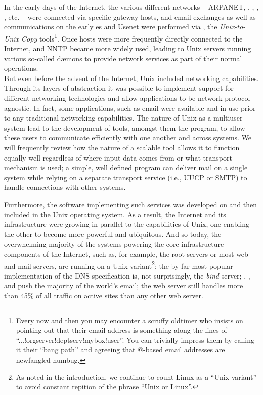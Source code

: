 In the early days of the Internet, the various
different networks -- ARPANET,
,
,
,
, etc. -- were connected
via specific gateway hosts, and email exchanges as
well as communications on the early
es and
Usenet were performed via
, the {\em Unix-to-Unix Copy}
tools\footnote{Every now and then you may encounter
a scruffy oldtimer who insists on pointing out that
their email address is something along the lines of
``...!orgserver!deptserv!mybox!user''. You can
trivially impress them by calling it their ``bang
path'' and agreeing that @-based email addresses are
newfangled humbug.}.  Once hosts were more frequently
directly connected to the Internet,
 and NNTP
became more widely used, leading to Unix servers
running various so-called  d\ae mons
to provide network services as part of their normal
operations.  \\

But even before the advent of the Internet, Unix
included networking capabilities.  Through its layers
of abstraction it was possible to implement support
for different networking technologies and allow
applications to be network protocol agnostic.  In
fact, some applications, such as  email
were available and in use prior to any traditional
networking capabilities.  The nature of Unix as a
multiuser system lead to the development of tools,
amongst them the  program, to allow
these users to communicate efficiently with one
another and across systems.  We will frequently review
how the nature of a scalable tool allows it to
function equally well regardless of where input data
comes from or what transport mechanism is used; a
simple, well defined program can deliver mail on a
single system while relying on a separate transport
service (i.e., UUCP or SMTP) to handle connections
with other systems.

Furthermore, the software implementing such services
was developed on and then included in the Unix
operating system.  As a result, the Internet and its
infrastructure were growing in parallel to the
capabilities of Unix, one enabling the other to become
more powerful and ubiquitous. And so today, the
overwhelming majority of the systems powering the core
infrastructure components of the Internet, such as,
for example, the  root
servers or most
web- and mail servers, are running on a Unix
variant\footnote{As noted in the introduction, we
continue to count Linux as a ``Unix variant'' to avoid
constant repition of the phrase ``Unix or Linux''.}:
the by far most popular implementation of the DNS
specification is, not surprisingly, the {\em
\gls{bind}} server\cite{history:dns-survey};
, , and
 push the majority of the world's
email\cite{history:esoft-mx}; the
 web server
still handles more than 45\% of all
 traffic on active sites than any
other web server\cite{history:netcraft-http}.


